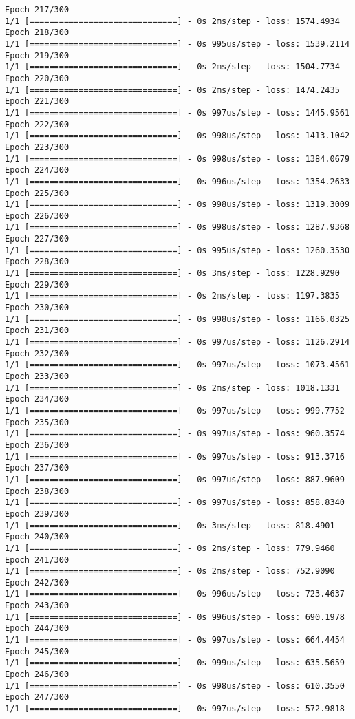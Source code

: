 \documentclass[11pt]{article}
\begin{document}
\begin{Verbatim}[commandchars=\\\{\}]
Epoch 217/300
1/1 [==============================] - 0s 2ms/step - loss: 1574.4934
Epoch 218/300
1/1 [==============================] - 0s 995us/step - loss: 1539.2114
Epoch 219/300
1/1 [==============================] - 0s 2ms/step - loss: 1504.7734
Epoch 220/300
1/1 [==============================] - 0s 2ms/step - loss: 1474.2435
Epoch 221/300
1/1 [==============================] - 0s 997us/step - loss: 1445.9561
Epoch 222/300
1/1 [==============================] - 0s 998us/step - loss: 1413.1042
Epoch 223/300
1/1 [==============================] - 0s 998us/step - loss: 1384.0679
Epoch 224/300
1/1 [==============================] - 0s 996us/step - loss: 1354.2633
Epoch 225/300
1/1 [==============================] - 0s 998us/step - loss: 1319.3009
Epoch 226/300
1/1 [==============================] - 0s 998us/step - loss: 1287.9368
Epoch 227/300
1/1 [==============================] - 0s 995us/step - loss: 1260.3530
Epoch 228/300
1/1 [==============================] - 0s 3ms/step - loss: 1228.9290
Epoch 229/300
1/1 [==============================] - 0s 2ms/step - loss: 1197.3835
Epoch 230/300
1/1 [==============================] - 0s 998us/step - loss: 1166.0325
Epoch 231/300
1/1 [==============================] - 0s 997us/step - loss: 1126.2914
Epoch 232/300
1/1 [==============================] - 0s 997us/step - loss: 1073.4561
Epoch 233/300
1/1 [==============================] - 0s 2ms/step - loss: 1018.1331
Epoch 234/300
1/1 [==============================] - 0s 997us/step - loss: 999.7752
Epoch 235/300
1/1 [==============================] - 0s 997us/step - loss: 960.3574
Epoch 236/300
1/1 [==============================] - 0s 997us/step - loss: 913.3716
Epoch 237/300
1/1 [==============================] - 0s 997us/step - loss: 887.9609
Epoch 238/300
1/1 [==============================] - 0s 997us/step - loss: 858.8340
Epoch 239/300
1/1 [==============================] - 0s 3ms/step - loss: 818.4901
Epoch 240/300
1/1 [==============================] - 0s 2ms/step - loss: 779.9460
Epoch 241/300
1/1 [==============================] - 0s 2ms/step - loss: 752.9090
Epoch 242/300
1/1 [==============================] - 0s 996us/step - loss: 723.4637
Epoch 243/300
1/1 [==============================] - 0s 996us/step - loss: 690.1978
Epoch 244/300
1/1 [==============================] - 0s 997us/step - loss: 664.4454
Epoch 245/300
1/1 [==============================] - 0s 999us/step - loss: 635.5659
Epoch 246/300
1/1 [==============================] - 0s 998us/step - loss: 610.3550
Epoch 247/300
1/1 [==============================] - 0s 997us/step - loss: 572.9818

\end{Verbatim}
\end{document}
